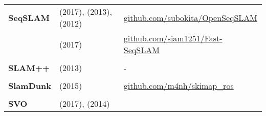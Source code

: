 \documentclass[a4paper,12pt]{scrartcl}
\begin{document}
{\begin{longtable}{l|l|l}
    \textbf{SeqSLAM}                                                                                                              & \cite{bai2017} (2017), \cite{Sunderhauf2013} (2013), \cite{Milford2012} (2012)
                                                                                                                                  & {\href{https://github.com/subokita/OpenSeqSLAM}{github.com/subokita/OpenSeqSLAM}}         \\
                                                                                                                                  & \cite{Siam2017} (2017)
                                                                                                                                  & {\href{https://github.com/siam1251/Fast-SeqSLAM}{github.com/siam1251/Fast-SeqSLAM}}       \\
                                                                                                                                  &                                                                                            &   \\ [-3mm]
    \textbf{SLAM++}                                                                                                               & \cite{Salas-moreno2013} (2013)                                                             & - \\
                                                                                                                                  &                                                                                            &   \\ [-3mm]
    \textbf{SlamDunk}                                                                                                             & \cite{Fioraio2015} (2015)
                                                                                                                                  & {\href{https://github.com/m4nh/skimap_ros}{github.com/m4nh/skimap\_ros}}                  \\
                                                                                                                                  &                                                                                            &   \\ [-3mm]
    \textbf{SVO}                                                                                                                  & \cite{Forster2017} (2017), \cite{Forster2014a} (2014)

\end{longtable}}
\end{document}
